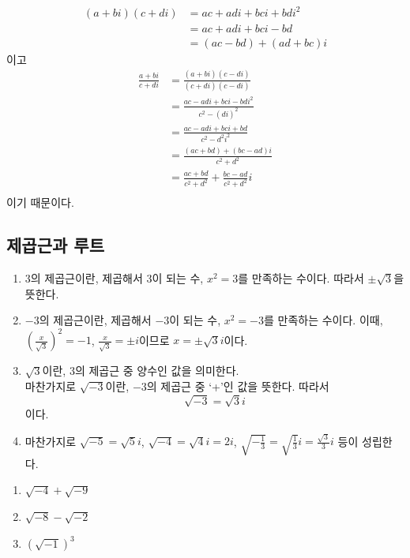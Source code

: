 \documentclass{oblivoir}
\begin{document}
\begin{align*}
(a+bi)(c+di)
&=ac+adi+bci+bdi^2\\
&=ac+adi+bci-bd\\
&=(ac-bd)+(ad+bc)i
\end{align*}
이고
\begin{align*}
\frac{a+bi}{c+di}
&=\frac{(a+bi)(c-di)}{(c+di)(c-di)}\\
&=\frac{ac-adi+bci-bdi^2}{c^2-(di)^2}\\
&=\frac{ac-adi+bci+bd}{c^2-d^2i^2}\\
&=\frac{(ac+bd)+(bc-ad)i}{c^2+d^2}\\
&=\frac{ac+bd}{c^2+d^2}+\frac{bc-ad}{c^2+d^2}i\\
\end{align*}
이기 때문이다.

\clearpage
\subsection{제곱근과 루트}

%
\exam{}
\begin{enumerate}
\item
\(3\)의 제곱근이란, 제곱해서 \(3\)이 되는 수, \(x^2=3\)를 만족하는 수이다.
따라서 \(\pm\sqrt3\)을 뜻한다.
\item
\(-3\)의 제곱근이란, 제곱해서 \(-3\)이 되는 수, \(x^2=-3\)를 만족하는 수이다.
이때, \(\left(\frac x{\sqrt3}\right)^2=-1\), \(\frac x{\sqrt3}=\pm i\)이므로 \(x=\pm\sqrt3i\)이다.
\item
\(\sqrt3\)이란, \(3\)의 제곱근 중 양수인 값을 의미한다.\\
마찬가지로 \(\sqrt{-3}\)이란, \(-3\)의 제곱근 중 `+'인 값을 뜻한다.
따라서
\[\sqrt{-3}=\sqrt3i\]
이다.
\item
마찬가지로 \(\sqrt{-5}=\sqrt5i\), \(\sqrt{-4}=\sqrt4i=2i\), \(\sqrt{-\frac13}=\sqrt{\frac13}i=\frac{\sqrt3}3i\) 등이 성립한다.
\end{enumerate}

%
\begin{enumerate}\label{comp10}
\item
\(\sqrt{-4}+\sqrt{-9}\)
\item
\(\sqrt{-8}-\sqrt{-2}\)
\item
\(\left(\sqrt{-1}\right)^3\)
\end{enumerate}
\end{document}
